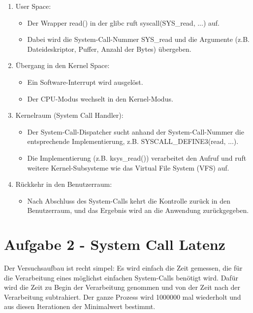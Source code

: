 \documentclass[12pt]{article}
\begin{document}
\begin{enumerate}
	\item User Space:
	\begin{itemize}
		\item Der Wrapper read() in der glibc ruft syscall(SYS\_read, ...) auf.
		\item Dabei wird die System-Call-Nummer SYS\_read und die Argumente (z.B. Dateideskriptor, Puffer, Anzahl der Bytes) übergeben.
	\end{itemize}
	
	
	\item Übergang in den Kernel Space:
	\begin{itemize}
		\item Ein Software-Interrupt wird ausgelöst.
		\item Der CPU-Modus wechselt in den Kernel-Modus.
	\end{itemize}
	
	
	\item Kernelraum (System Call Handler):
	
	\begin{itemize}
		\item Der System-Call-Dispatcher sucht anhand der System-Call-Nummer die entsprechende Implementierung, z.B. SYSCALL\_DEFINE3(read, ...).
		\item Die Implementierung (z.B. ksys\_read()) verarbeitet den Aufruf und ruft weitere Kernel-Subsysteme wie das Virtual File System (VFS) auf.
	\end{itemize}
	
	
	\item Rückkehr in den Benutzerraum:
	
	\begin{itemize}
		\item Nach Abschluss des System-Calls kehrt die Kontrolle zurück in den Benutzerraum, und das Ergebnis wird an die Anwendung zurückgegeben.
	\end{itemize}
	
\end{enumerate}

\section*{Aufgabe 2 - System Call Latenz}
Der Versuchsaufbau ist recht simpel: Es wird einfach die Zeit gemessen, die für die Verarbeitung eines möglichst einfachen System-Calls benötigt wird. Dafür wird die Zeit zu Begin der Verarbeitung genommen und von der Zeit nach der Verarbeitung subtrahiert. Der ganze Prozess wird 1000000 mal wiederholt und aus diesen Iterationen der Minimalwert bestimmt.
\end{document}
